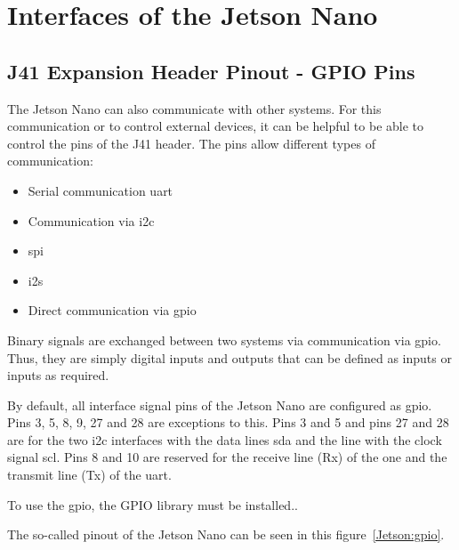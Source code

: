 	
	

\section{Interfaces of the Jetson Nano}



\subsection{J41 Expansion Header Pinout - GPIO Pins}

The Jetson Nano can also communicate with other systems. For this communication or to control external devices, it can be helpful to be able to control the pins of the J41 header. The pins allow different types of communication:

\begin{itemize}
    \item Serial communication \ac{uart}
    \item Communication via \ac{i2c}
    \item \ac{spi}
    \item \ac{i2s}
    \item Direct communication via \ac{gpio}
\end{itemize}    



Binary signals are exchanged between two systems via communication via \ac{gpio}. Thus, they are simply digital inputs and outputs that can be defined as inputs or inputs as required.

By default, all interface signal pins of the Jetson Nano are configured as \ac{gpio}. Pins 3, 5, 8, 9, 27 and 28 are exceptions to this. 
Pins 3 and 5 and pins 27 and 28 are for the two \ac{i2c} interfaces with the data lines \ac{sda} and the line with the clock signal \ac{scl}. Pins 8 and 10 are reserved for the receive line (Rx) of the one and the transmit line (Tx) of the \ac{uart}. \cite{JetsonUserManual:2020} 

To use the \ac{gpio}, the GPIO library must be installed.\cite{GitHubGPIO:2020}.

\medskip

The so-called pinout of the Jetson Nano can be seen in this figure~\ref{Jetson:gpio}.

%
%   
%
%

